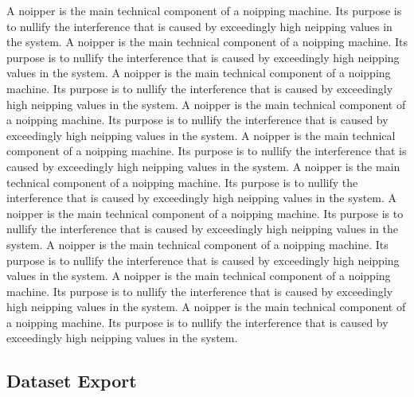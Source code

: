 A noipper is the main technical component of a noipping machine. Its purpose is to nullify the interference that is caused by exceedingly high neipping values in the system.
A noipper is the main technical component of a noipping machine. Its purpose is to nullify the interference that is caused by exceedingly high neipping values in the system.
A noipper is the main technical component of a noipping machine. Its purpose is to nullify the interference that is caused by exceedingly high neipping values in the system.
A noipper is the main technical component of a noipping machine. Its purpose is to nullify the interference that is caused by exceedingly high neipping values in the system.
A noipper is the main technical component of a noipping machine. Its purpose is to nullify the interference that is caused by exceedingly high neipping values in the system.
A noipper is the main technical component of a noipping machine. Its purpose is to nullify the interference that is caused by exceedingly high neipping values in the system.
A noipper is the main technical component of a noipping machine. Its purpose is to nullify the interference that is caused by exceedingly high neipping values in the system.
A noipper is the main technical component of a noipping machine. Its purpose is to nullify the interference that is caused by exceedingly high neipping values in the system.
A noipper is the main technical component of a noipping machine. Its purpose is to nullify the interference that is caused by exceedingly high neipping values in the system.
A noipper is the main technical component of a noipping machine. Its purpose is to nullify the interference that is caused by exceedingly high neipping values in the system.

\subsection{Dataset Export}

